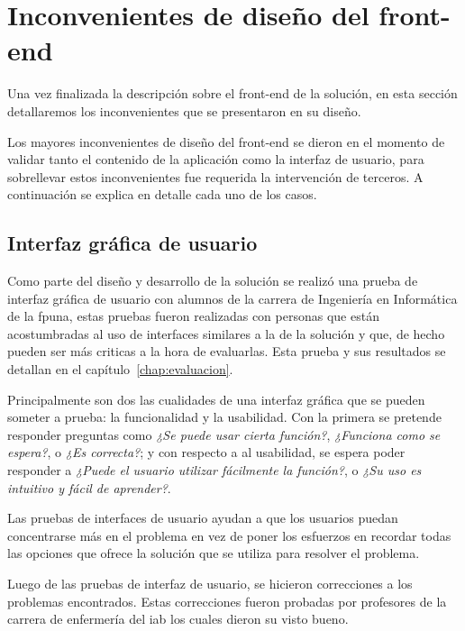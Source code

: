 \section{Inconvenientes de diseño del front-end}
Una vez finalizada la descripción sobre el front-end de la solución, en esta sección 
detallaremos los inconvenientes que se presentaron en su diseño.

Los mayores inconvenientes de diseño del front-end se dieron en el momento de
validar tanto el contenido de la aplicación como la interfaz de usuario, para
sobrellevar estos inconvenientes fue requerida la intervención de terceros. A continuación 
se explica en detalle cada uno de los casos.

\subsection{Interfaz gráfica de usuario}


Como parte del diseño y desarrollo de la solución se realizó una prueba de
interfaz gráfica de usuario con alumnos de la carrera de Ingeniería en Informática de la
\Gls{fpuna}, estas pruebas fueron realizadas con personas que están
acostumbradas al uso de interfaces similares a la de la solución y que, de hecho pueden ser más
criticas a la hora de evaluarlas. Esta prueba y sus resultados se detallan  en el
capítulo~\ref{chap:evaluacion}.

Principalmente son dos las cualidades de una interfaz gráfica que se pueden
someter a prueba: la funcionalidad y la usabilidad. Con la primera se pretende
responder preguntas como \textit{¿Se puede usar cierta función?},
\textit{¿Funciona como se espera?}, o \textit{¿Es correcta?}; y con respecto a
al usabilidad, se espera poder responder a \textit{¿Puede el usuario
    utilizar fácilmente la función?}, o \textit{¿Su uso es intuitivo y fácil de
    aprender?}\cite{fragaverificacion}.

Las pruebas de interfaces de usuario ayudan a que los usuarios puedan
concentrarse más en el problema en vez de poner los esfuerzos en recordar todas
las opciones que ofrece la solución que se utiliza para resolver el
problema\cite{horowitz1993graphical}.

Luego de las pruebas de interfaz de usuario, se hicieron correcciones a los
problemas encontrados. Estas correcciones fueron
probadas por profesores de la carrera de enfermería del \Gls{iab} los cuales
dieron su visto bueno.

